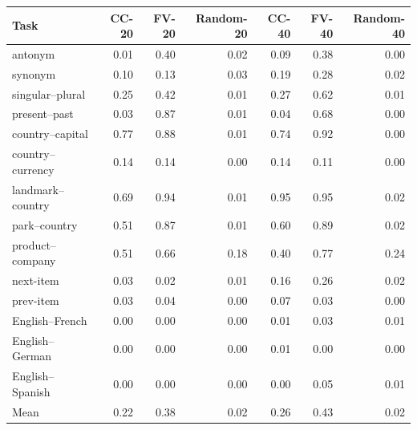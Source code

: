 \begin{tabular}{lrrrrrr}
\toprule
Task & CC-20 & FV-20 & Random-20 & CC-40 & FV-40 & Random-40 \\
\midrule
antonym & 0.01 & 0.40 & 0.02 & 0.09 & 0.38 & 0.00 \\
synonym & 0.10 & 0.13 & 0.03 & 0.19 & 0.28 & 0.02 \\
singular--plural & 0.25 & 0.42 & 0.01 & 0.27 & 0.62 & 0.01 \\
present--past & 0.03 & 0.87 & 0.01 & 0.04 & 0.68 & 0.00 \\
country--capital & 0.77 & 0.88 & 0.01 & 0.74 & 0.92 & 0.00 \\
country--currency & 0.14 & 0.14 & 0.00 & 0.14 & 0.11 & 0.00 \\
landmark--country & 0.69 & 0.94 & 0.01 & 0.95 & 0.95 & 0.02 \\
park--country & 0.51 & 0.87 & 0.01 & 0.60 & 0.89 & 0.02 \\
product--company & 0.51 & 0.66 & 0.18 & 0.40 & 0.77 & 0.24 \\
next-item & 0.03 & 0.02 & 0.01 & 0.16 & 0.26 & 0.02 \\
prev-item & 0.03 & 0.04 & 0.00 & 0.07 & 0.03 & 0.00 \\
English--French & 0.00 & 0.00 & 0.00 & 0.01 & 0.03 & 0.01 \\
English--German & 0.00 & 0.00 & 0.00 & 0.01 & 0.00 & 0.00 \\
English--Spanish & 0.00 & 0.00 & 0.00 & 0.00 & 0.05 & 0.01 \\
\midrule
Mean & 0.22 & 0.38 & 0.02 & 0.26 & 0.43 & 0.02 \\
\bottomrule
\end{tabular}
